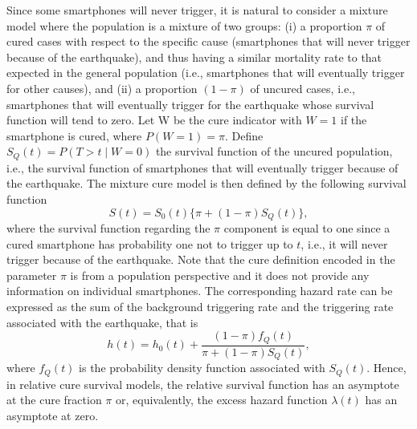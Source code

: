 \documentclass[final]{statsoc}
\begin{document}
Since some smartphones will never trigger, it is natural to consider a mixture model where the population is a mixture of two groups: (i) a proportion $\pi$ of cured cases with respect to the specific cause (smartphones that will never trigger because of the earthquake), and thus having a similar mortality rate to that expected in the general population (i.e., smartphones that will eventually trigger for other causes), and (ii) a proportion $(1-\pi)$ of uncured cases, i.e., smartphones that will eventually trigger for the earthquake whose survival function will tend to zero. Let W be the cure indicator with $W = 1$ if the smartphone is cured, where $P(W = 1) = \pi$. Define $S_{Q}(t) = P(T > t \mid W = 0)$ the survival function of the uncured population, i.e., the survival function of smartphones that will eventually trigger because of the earthquake. The mixture cure model is then defined by the following survival function
%
\begin{equation}
    S(t) = S_{0}(t)\{\pi + (1-\pi)S_{Q}(t)\},
\end{equation}
%
where the survival function regarding the $\pi$ component is equal to one since a cured smartphone has probability one not to trigger up to  $t$, i.e., it will never trigger because of the earthquake. Note that the cure definition encoded in the parameter $\pi$ is from a population perspective and it does not provide any information on individual smartphones. The corresponding hazard rate can be expressed as the sum of the background triggering rate and the triggering rate associated with the earthquake, that is
%
\begin{equation}
    h(t) = h_{0}(t) + \frac{(1-\pi)f_{Q}(t)}{\pi + (1-\pi)S_{Q}(t)},
    \label{eq:ht}
\end{equation}
%
where $f_{Q}(t)$ is the probability density function associated with $S_{Q}(t)$. Hence, in relative cure survival models, the relative survival function has an asymptote at the cure fraction $\pi$ or, equivalently, the excess hazard function $\lambda(t)$ has an asymptote at zero.
\end{document}
